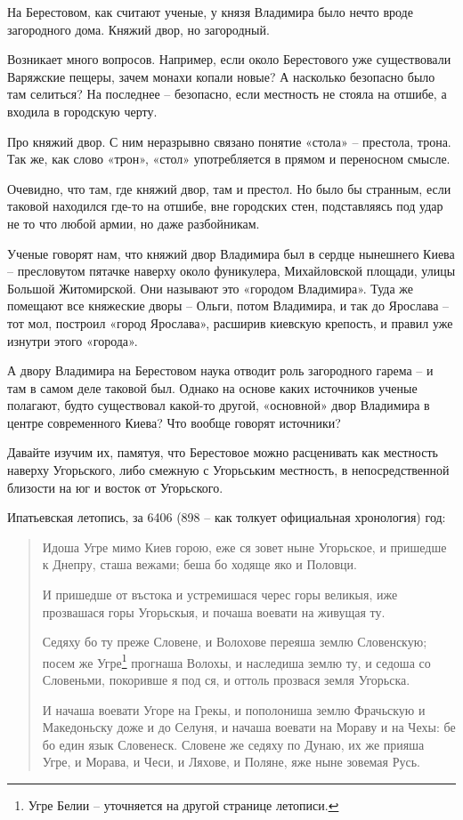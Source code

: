 На Берестовом, как считают ученые, у князя Владимира было нечто вроде загородного дома. Княжий двор, но загородный. %

Возникает много вопросов. Например, если около Берестового уже существовали Варяжские пещеры, зачем монахи копали новые? А насколько безопасно было там селиться? На последнее – безопасно, если местность не стояла на отшибе, а входила в городскую черту.


Про княжий двор. С ним неразрывно связано понятие «стола» – престола, трона. Так же, как слово «трон», «стол» употребляется в прямом и переносном смысле.

Очевидно, что там, где княжий двор, там и престол. Но было бы странным, если таковой находился где-то на отшибе, вне городских стен, подставляясь под удар не то что любой армии, но даже разбойникам. 
 
Ученые говорят нам, что княжий двор Владимира был в сердце нынешнего Киева – пресловутом пятачке наверху около фуникулера, Михайловской площади, улицы Большой Житомирской. Они называют это «городом Владимира». Туда же помещают все княжеские дворы – Ольги, потом Владимира, и так до Ярослава – тот мол, построил «город Ярослава», расширив киевскую крепость, и правил уже изнутри этого «города».

А двору Владимира на Берестовом наука отводит роль загородного гарема – и там в самом деле таковой был. Однако на основе каких источников ученые полагают, будто существовал какой-то другой, «основной» двор Владимира в центре современного Киева? Что вообще говорят источники?

Давайте изучим их, памятуя, что Берестовое можно расценивать как местность наверху Угорьского, либо смежную с Угорьським местность, в непосредственной близости на юг и восток от Угорьского.

Ипатьевская летопись, за 6406 (898 – как толкует официальная хронология) год:

\begin{quotation}
Идоша Угре мимо Киев горою, еже ся зовет ныне Угорьское, и пришедше к Днепру, сташа вежами; беша бо ходяще яко и Половци.

И пришедше от въстока и устремишася черес горы великыя, иже прозвашася горы Угорьскыя, и почаша воевати на живущая ту. 

Седяху бо ту преже Словене, и Волохове переяша землю Словенскую; посем же Угре\footnote{Угре Белии – уточняется на другой странице летописи.} прогнаша Волохы, и наследиша землю ту, и седоша со Словеньми, покоривше я под ся, и оттоль прозвася земля Угорьска.

И начаша воевати Угоре на Грекы, и пополониша землю Фрачьскую и Македоньску доже и до Селуня, и начаша воевати на Мораву и на Чехы: бе бо един язык Словенеск. Словене же седяху по Дунаю, их же прияша Угре, и Морава, и Чеси, и Ляхове, и Поляне, яже ныне зовемая Русь.
\end{quotation}

